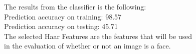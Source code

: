 The results from the classifier is the following:\\
Prediction accuracy on training: 98.57\\
Prediction accuracy on testing: 45.71\\
The selected Haar Features are the features that will be used\\
in the evaluation of whether or not an image is a face.\\

